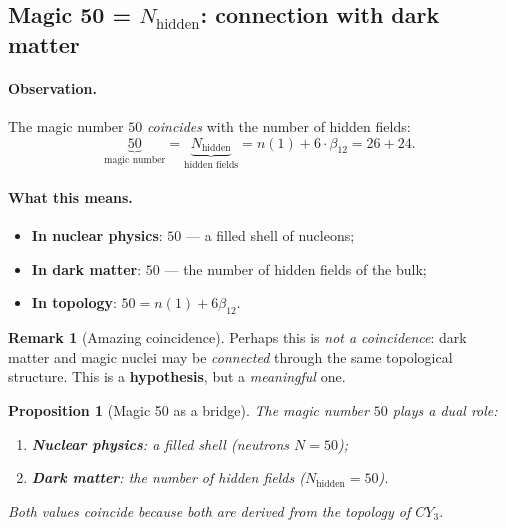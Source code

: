 \documentclass[11pt,a4paper]{article}
\newcommand{\CY}{CY_3}
\newcommand{\Nhidden}{N_{\text{hidden}}}
\newtheorem{proposition}[theorem]{Proposition}
\theoremstyle{definition}
\newtheorem{remark}[theorem]{Remark}
\begin{document}
\subsection{Magic 50 = $\Nhidden$: connection with dark matter}
\label{subsec:magic-50-dm}

\paragraph{Observation.}
The magic number $50$ \emph{coincides} with the number of hidden fields:
\begin{equation}
    \boxed{
    \underbrace{50}_{\text{magic number}} 
    = \underbrace{\Nhidden}_{\text{hidden fields}}
    = n(1) + 6 \cdot \beta_{12} = 26 + 24.
    }
    \label{eq:magic-50-dm}
\end{equation}

\paragraph{What this means.}
\begin{itemize}
    \item \textbf{In nuclear physics}: $50$ — a filled shell 
          of nucleons;
    \item \textbf{In dark matter}: $50$ — the number of hidden fields 
          of the bulk;
    \item \textbf{In topology}: $50 = n(1) + 6\beta_{12}$.
\end{itemize}

\begin{remark}[Amazing coincidence]
\label{rem:magic-50-amazing}
Perhaps this is \emph{not a coincidence}: dark matter and 
magic nuclei may be \emph{connected} through the same 
topological structure. This is a \textbf{hypothesis}, but 
a \emph{meaningful} one.
\end{remark}

\begin{proposition}[Magic 50 as a bridge]
\label{prop:magic-50-bridge}
The magic number $50$ plays a \emph{dual} role:
\begin{enumerate}
    \item \textbf{Nuclear physics}: a filled shell 
          (neutrons $N = 50$);
    \item \textbf{Dark matter}: the number of hidden fields 
          ($\Nhidden = 50$).
\end{enumerate}
Both values coincide because both are derived from the 
topology of $\CY$.
\end{proposition}
\end{document}
